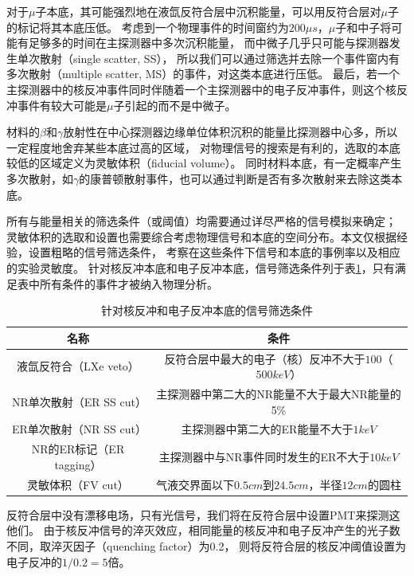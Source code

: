对于$\mu$子本底，其可能强烈地在液氙反符合层中沉积能量，可以用反符合层对$\mu$子的标记将其本底压低。
考虑到一个物理事件的时间窗约为$200\mu s$，$\mu$子和中子将可能有足够多的时间在主探测器中多次沉积能量，
而中微子几乎只可能与探测器发生单次散射（single scatter, SS），
所以我们可以通过筛选并去除一个事件窗内有多次散射（multiple scatter, MS）的事件，对这类本底进行压低。
最后，若一个主探测器中的核反冲事件同时伴随着一个主探测器中的电子反冲事件，则这个核反冲事件有较大可能是$\mu$子引起的而不是中微子。

材料的$\beta$和$\gamma$放射性在中心探测器边缘单位体积沉积的能量比探测器中心多，所以一定程度地舍弃某些本底过高的区域，
对物理信号的搜索是有利的，选取的本底较低的区域定义为灵敏体积（fiducial volume）。
同时材料本底，有一定概率产生多次散射，如$\gamma$的康普顿散射事件，也可以通过判断是否有多次散射来去除这类本底。

所有与能量相关的筛选条件（或阈值）均需要通过详尽严格的信号模拟来确定；
灵敏体积的选取和设置也需要综合考虑物理信号和本底的空间分布。本文仅根据经验，设置粗略的信号筛选条件，
考察在这些条件下信号和本底的事例率以及相应的实验灵敏度。
针对核反冲本底和电子反冲本底，信号筛选条件列于表\ref{tab:cuts}，只有满足表中所有条件的事件才被纳入物理分析。

\begin{table}
  \centering
  \caption{针对核反冲和电子反冲本底的信号筛选条件}
  \begin{tabular}{cc}
    \toprule
    名称 & 条件 \\
    \midrule
    液氙反符合（LXe veto） & 反符合层中最大的电子（核）反冲不大于$100$（$500\si{keV}$） \\
    NR单次散射（ER SS cut） & 主探测器中第二大的NR能量不大于最大NR能量的5\% \\
    ER单次散射（NR SS cut） & 主探测器中第二大的ER能量不大于$1\si{keV}$ \\
    NR的ER标记（ER tagging） & 主探测器中与NR事件同时发生的ER不大于$10\si{keV}$ \\
    灵敏体积（FV cut） & 气液交界面以下$0.5\si{cm}$到$24.5\si{cm}$，半径$12\si{cm}$的圆柱 \\
    \bottomrule
  \end{tabular}
  \label{tab:cuts}
\end{table}

反符合层中没有漂移电场，只有光信号，我们将在反符合层中设置PMT来探测这他们。
由于核反冲信号的淬灭效应，相同能量的核反冲和电子反冲产生的光子数不同，取淬灭因子（quenching factor）为0.2，
则将反符合层的核反冲阈值设置为电子反冲的$1/0.2=5$倍。

